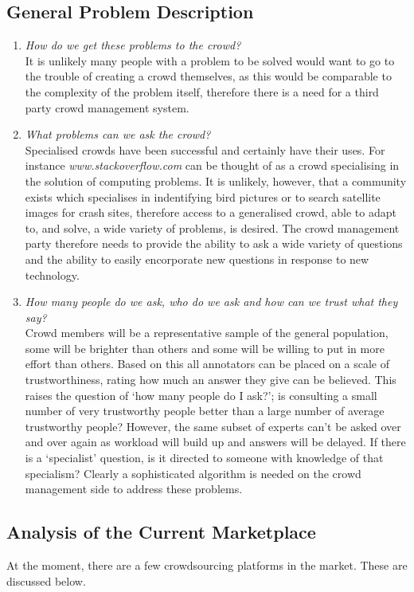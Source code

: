 \documentclass[11pt]{article}
\begin{document}
\subsection{General Problem Description}
\begin{enumerate}
\item
\emph{How do we get these problems to the crowd?} 
\\
It is unlikely many people with a problem to be solved would want to go to the trouble
of creating a crowd themselves, as this would be comparable to the complexity of the problem itself, therefore there is a need for a third party
crowd management system. 
\item
\emph{What problems can we ask the crowd?} 
\\
Specialised crowds have been successful and certainly have their uses. For instance 
\emph{www.stackoverflow.com} can be thought of as a crowd specialising in the solution of computing problems. It is unlikely, however, that a community exists which specialises in indentifying bird pictures or to search satellite images for crash sites, therefore access to a generalised crowd, able to adapt to, and solve, a wide variety of problems, is desired. The crowd management party therefore needs to provide
the ability to ask a wide variety of questions and the ability to easily encorporate new questions in response to new technology.
\item
\emph{How many people do we ask, who do we ask and how can we trust what they say?} 
\\
Crowd members will be a representative sample of the general 
population, some will be brighter than others and some will be willing to put in more effort than others. Based on this all 
annotators can be placed on a scale of trustworthiness, rating how much an answer they give can be believed. This raises the question of `how many 
people do I ask?'; is consulting a small number of very trustworthy people better than a large number of average trustworthy people? However, the same subset of experts
can't be asked over and over again as workload will build up and answers will be delayed. If there is a 
`specialist' question, is it directed to someone with knowledge of that specialism? Clearly a sophisticated algorithm is needed on the crowd
management side to address these problems. 
\end{enumerate}


\subsection{Analysis of the Current Marketplace}
At the moment, there are a few crowdsourcing platforms in the market. These
are discussed below.
\end{document}
